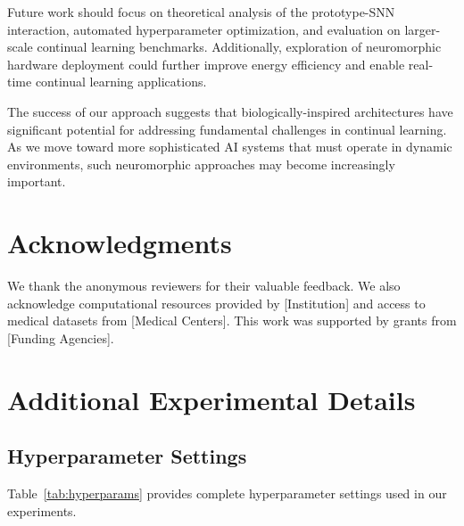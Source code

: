 \documentclass{article}
\begin{document}
Future work should focus on theoretical analysis of the prototype-SNN interaction, automated hyperparameter optimization, and evaluation on larger-scale continual learning benchmarks. Additionally, exploration of neuromorphic hardware deployment could further improve energy efficiency and enable real-time continual learning applications.

The success of our approach suggests that biologically-inspired architectures have significant potential for addressing fundamental challenges in continual learning. As we move toward more sophisticated AI systems that must operate in dynamic environments, such neuromorphic approaches may become increasingly important.

\section*{Acknowledgments}

We thank the anonymous reviewers for their valuable feedback. We also acknowledge computational resources provided by [Institution] and access to medical datasets from [Medical Centers]. This work was supported by grants from [Funding Agencies].




\appendix

\section{Additional Experimental Details}
\label{sec:appendix_experiments}

\subsection{Hyperparameter Settings}

Table~\ref{tab:hyperparams} provides complete hyperparameter settings used in our experiments.
\end{document}
